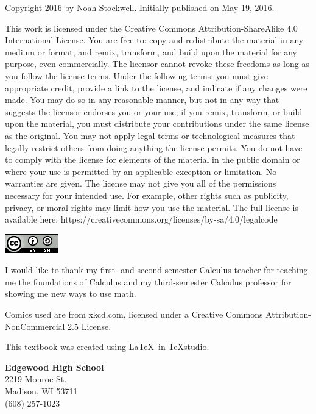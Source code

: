 \documentclass[../revisedmain.tex]{subfiles}
\begin{document}
	\par Copyright 2016 by Noah Stockwell. Initially published on May 19, 2016.\\\par This work is licensed under the Creative Commons Attribution-ShareAlike 4.0 International License. You are free to: copy and redistribute the material in any medium or format; and remix, transform, and build upon the material for any purpose, even commercially. The licensor cannot revoke these freedoms as long as you follow the license terms. Under the following terms: you must give appropriate credit, provide a link to the license, and indicate if any changes were made. You may do so in any reasonable manner, but not in any way that suggests the licensor endorses you or your use; if you remix, transform, or build upon the material, you must distribute your contributions under the same license as the original. You may not apply legal terms or technological measures that legally restrict others from doing anything the license permits. You do not have to comply with the license for elements of the material in the public domain or where your use is permitted by an applicable exception or limitation. No warranties are given. The license may not give you all of the permissions necessary for your intended use. For example, other rights such as publicity, privacy, or moral rights may limit how you use the material. The full license is available here: https://creativecommons.org/licenses/by-sa/4.0/legalcode\\
	\begin{center}\includegraphics[width=.5in]{license}\end{center}\vfill\par I would like to thank my first- and second-semester Calculus teacher for teaching me the foundations of Calculus and my third-semester Calculus professor for showing me new ways to use math.\\\vfill
	\par Comics used are from xkcd.com, licensed under a Creative Commons Attribution-NonCommercial 2.5 License.\\
	\vspace{.25in}\par This textbook was created using \LaTeX\, in TeXstudio.\\
	\vspace{.25in}
	\begin{flushright}
	\textbf{Edgewood High School}\\
	2219 Monroe St.\\ Madison, WI 53711\\ (608) 257-1023
	\end{flushright}
\end{document}
